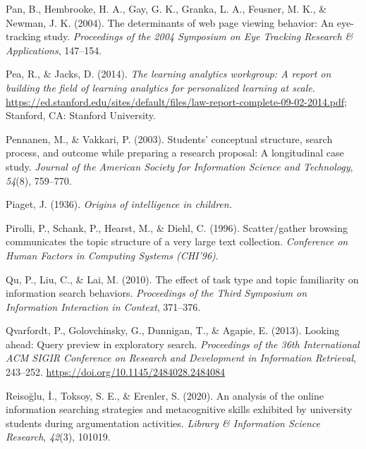 \documentclass[letterpaper, nobind]{templates/ociamthesis}
\newlength{\cslhangindent}
\newenvironment{CSLReferences}[2] %
 {%
  \setlength{\parindent}{0pt}
  \ifodd #1
  \let\oldpar\par
  \def\par{\hangindent=\cslhangindent\oldpar}
  \fi
  \setlength{\parskip}{1mm}
  \setlength{\baselineskip}{6mm}
 }%
 {}
\begin{document}
\begin{CSLReferences}{1}{0}
\leavevmode{}%
Pan, B., Hembrooke, H. A., Gay, G. K., Granka, L. A., Feusner, M. K., \& Newman, J. K. (2004). The determinants of web page viewing behavior: An eye-tracking study. \emph{Proceedings of the 2004 Symposium on Eye Tracking Research \& Applications}, 147--154.

\leavevmode{}%
Pea, R., \& Jacks, D. (2014). \emph{The learning analytics workgroup: A report on building the field of learning analytics for personalized learning at scale}. \url{https://ed.stanford.edu/sites/default/files/law-report-complete-09-02-2014.pdf}; Stanford, CA: Stanford University.

\leavevmode{}%
Pennanen, M., \& Vakkari, P. (2003). Students' conceptual structure, search process, and outcome while preparing a research proposal: A longitudinal case study. \emph{Journal of the American Society for Information Science and Technology}, \emph{54}(8), 759--770.

\leavevmode{}%
Piaget, J. (1936). \emph{Origins of intelligence in children.}

\leavevmode{}%
Pirolli, P., Schank, P., Hearst, M., \& Diehl, C. (1996). Scatter/gather browsing communicates the topic structure of a very large text collection. \emph{Conference on Human Factors in Computing Systems (CHI'96)}.

\leavevmode{}%
Qu, P., Liu, C., \& Lai, M. (2010). The effect of task type and topic familiarity on information search behaviors. \emph{Proceedings of the Third Symposium on Information Interaction in Context}, 371--376.

\leavevmode{}%
Qvarfordt, P., Golovchinsky, G., Dunnigan, T., \& Agapie, E. (2013). Looking ahead: {Query} preview in exploratory search. \emph{Proceedings of the 36th International {ACM SIGIR} Conference on Research and Development in Information Retrieval}, 243--252. \url{https://doi.org/10.1145/2484028.2484084}

\leavevmode{}%
Reisoğlu, İ., Toksoy, S. E., \& Erenler, S. (2020). An analysis of the online information searching strategies and metacognitive skills exhibited by university students during argumentation activities. \emph{Library \& Information Science Research}, \emph{42}(3), 101019.


\end{CSLReferences}
\end{document}
